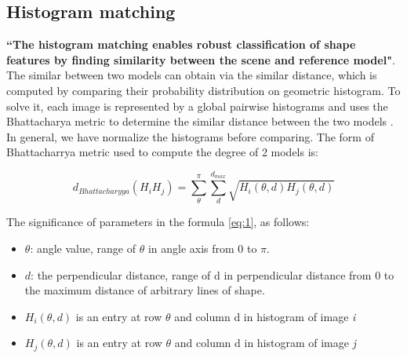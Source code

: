 \subsection{Histogram matching}
\textbf{``The histogram matching enables robust classification of shape features by finding similarity between the scene and reference model"}\cite{palaniswamy2010automatic}. The similar between two models can obtain via the similar distance, which is computed by comparing their probability distribution on geometric histogram. To solve it, each image is represented by a global pairwise histograms and uses the Bhattacharya\cite{thacker1995assessing} metric to determine the similar distance between the two models \cite{palaniswamy2010automatic}. In general, we have normalize the histograms before comparing. The form of Bhattacharrya metric used to compute the degree of 2 models is:
\begin{center}
\begin{equation} \label{eq:1}
d_{Bhattacharyya} (H_{i}H_{j}) = \sum\limits_{\theta}^{\pi}\sum\limits_{d}^{d_{max}}\sqrt{H_{i}(\theta,d)H_{j}(\theta,d)}
\end{equation}
\end{center}
The significance of parameters in the formula \ref{eq:1}, as follows:
\begin{itemize}
\item $\theta$: angle value, range of $\theta$ in angle axis from 0 to $\pi$.
\item $d$: the perpendicular distance, range of d in perpendicular distance from 0 to the maximum distance of arbitrary lines of shape.
\item $H_{i}(\theta,d)$ is an entry at row $\theta$ and column d in histogram of image \textit{i}
\item $H_{j}(\theta,d)$ is an entry at row $\theta$ and column d in histogram of image \textit{j}
\end{itemize}~~
